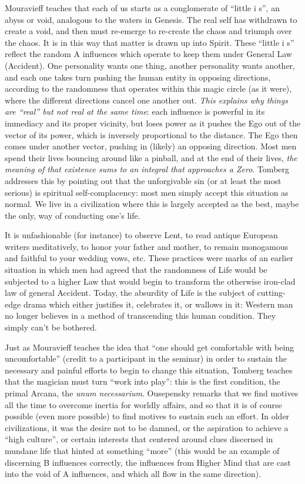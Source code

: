 Mouravieff teaches that each of us starts as a conglomerate of ``little i s'', an abyss or void, analogous to the waters in Genesis. The real self has withdrawn to create a void, and then must re-emerge to re-create the chaos and triumph over the chaos. It is in this way that matter is drawn up into Spirit. These ``little i s'' reflect the random A influences which operate to keep them under General Law (Accident). One personality wants one thing, another personality wants another, and each one takes turn pushing the human entity in opposing directions, according to the randomness that operates within this magic circle (as it were), where the different directions cancel one another out. \emph{This explains why things are ``real'' but not real at the same time}: each influence is powerful in its immediacy and its proper vicinity, but loses power as it pushes the Ego out of the vector of its power, which is inversely proportional to the distance. The Ego then comes under another vector, pushing in (likely) an opposing direction. Most men spend their lives bouncing around like a pinball, and at the end of their lives, \emph{the meaning of that existence sums to an integral that approaches a Zero}. Tomberg addresses this by pointing out that the unforgivable sin (or at least the most serious) is spiritual self-complacency: most men simply accept this situation as normal. We live in a civilization where this is largely accepted as the best, maybe the only, way of conducting one's life.

It is unfashionable (for instance) to observe Lent, to read antique European writers meditatively, to honor your father and mother, to remain monogamous and faithful to your wedding vows, etc. These practices were marks of an earlier situation in which men had agreed that the randomness of Life would be subjected to a higher Law that would begin to transform the otherwise iron-clad law of general Accident. Today, the absurdity of Life is the subject of cutting-edge drama which either justifies it, celebrates it, or wallows in it: Western man no longer believes in a method of transcending this human condition. They simply can't be bothered.

Just as Mouravieff teaches the idea that ``one should get comfortable with being uncomfortable'' (credit to a participant in the seminar) in order to sustain the necessary and painful efforts to begin to change this situation, Tomberg teaches that the magician must turn ``work into play'': this is the first condition, the primal Arcana, the \emph{unum necessarium}. Ousepensky remarks that we find motives all the time to overcome inertia for worldly affairs, and so that it is of course possible (even more possible) to find motives to sustain such an effort. In older civilizations, it was the desire not to be damned, or the aspiration to achieve a ``high culture'', or certain interests that centered around clues discerned in mundane life that hinted at something ``more'' (this would be an example of discerning B influences correctly, the influences from Higher Mind that are cast into the void of A influences, and which all flow in the same direction).


